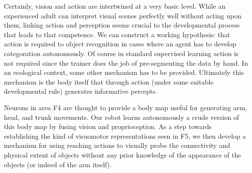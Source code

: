 Certainly, vision and action are intertwined at a very basic level.
While an
experienced adult can interpret visual scenes perfectly well without
acting upon them, linking action and perception seems crucial to the
developmental process that leads to that competence.  We can construct
a working hypothesis: that action is required to object recognition in
cases where an agent has to develop categor\iz{}ation autonomously.  Of
course in standard supervised learning action is not required since
the trainer does the job of pre-segmenting the data by hand.  In an
ecological context, some other mechanism has to be provided.
Ultimately this mechanism is the body itself that through action
(under some suitable developmental rule) generates informative
percepts.

Neurons in area F4 are thought to provide a body map useful for
generating arm, head, and trunk movements. Our robot learns
autonomously a crude version of this body map by fusing vision and
proprioception.  As a step towards establishing the kind of visuomotor
representations seen in F5, we then develop a mechanism for using
reaching actions to visually probe the connectivity and physical
extent of objects without any prior knowledge of the appearance of the
objects (or indeed of the arm itself).

\fi



